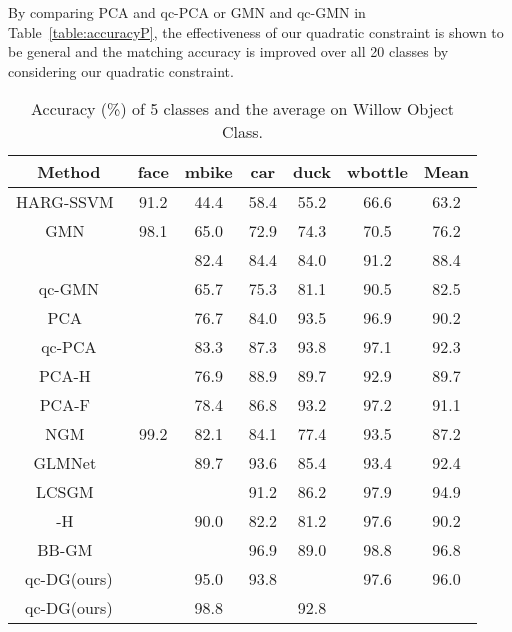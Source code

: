 \documentclass[final]{cvpr}
\begin{document}
By comparing PCA and qc-PCA or GMN and qc-GMN in Table~\ref{table:accuracyP}, the effectiveness of our quadratic constraint is shown to be general and the matching accuracy is improved over all 20 classes by considering our quadratic constraint.

\begin{table}[t!]
\vspace{-1mm}
\scriptsize
\centering
\begin{tabular}{c|ccccc|c}
\noalign{\smallskip}
\toprule
{Method} & {face} & {mbike} & {car} & {duck} & {wbottle} & {Mean} \\
\midrule
\noalign{\smallskip}
 HARG-SSVM~\cite{cho2013learning} & 91.2 & 44.4 & 58.4 & 55.2 & 66.6 & 63.2\\
 GMN~\cite{zanfir2018deep} & 98.1 & 65.0 & 72.9 & 74.3 & 70.5 & 76.2 \\
  &  & 82.4 & 84.4 & 84.0 & 91.2 & 88.4 \\
 qc-GMN &  & 65.7 & 75.3 & 81.1 & 90.5 & 82.5\\
 PCA~\cite{wang2019learning} &  & 76.7 & 84.0 & 93.5 & 96.9 & 90.2 \\
 qc-PCA &  & 83.3 & 87.3 & 93.8 & 97.1 & 92.3 \\
 PCA-H~\cite{wang2019learning} &  & 76.9 & 88.9 & 89.7 & 92.9 & 89.7 \\
 PCA-F~\cite{wang2019learning} &  & 78.4 & 86.8 & 93.2 & 97.2 & 91.1 \\
 NGM~\cite{wang2019neural} & 99.2 & 82.1 & 84.1 & 77.4 & 93.5 & 87.2 \\
 GLMNet~\cite{jiang2019glmnet} &  & 89.7 & 93.6 & 85.4 & 93.4 & 92.4 \\
 LCSGM~\cite{wang2020learning} &  &  & 91.2 & 86.2 & 97.9 & 94.9\\
 -H~\cite{yu2020learning} &  & 90.0 & 82.2 & 81.2 & 97.6 & 90.2 \\
 BB-GM~\cite{rolinek2020deep} &  &  & 96.9 & 89.0 & 98.8 & 96.8\\
\midrule
 qc-DG(ours) & & 95.0 & 93.8 &  & 97.6 & 96.0 \\
 qc-DG(ours) &  & 98.8 &  & 92.8 &  & \\
\bottomrule
\end{tabular}
\vspace{.2em}
\caption{Accuracy (\%) of 5 classes and the average on Willow Object Class.}
\label{table:willow}
\vspace{-3mm}
\end{table}
\end{document}
